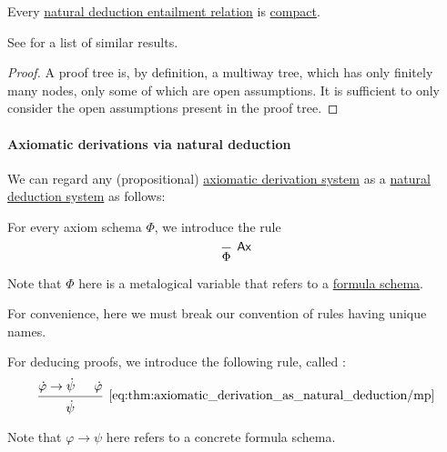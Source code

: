 \begin{proposition}\label{thm:propositional_natural_deduction_entailment_compact}
  Every \hyperref[def:natural_deduction_entailment]{natural deduction entailment relation} is \hyperref[def:consequence_relation/compactness]{compact}.
\end{proposition}
\begin{comments}
  \item See  for a list of similar results.
\end{comments}
\begin{proof}
  A proof tree is, by definition, a multiway tree, which has only finitely many nodes, only some of which are open assumptions. It is sufficient to only consider the open assumptions present in the proof tree.
\end{proof}

\paragraph{Axiomatic derivations via natural deduction}

\begin{remark}\label{rem:axiomatic_derivation_system_as_natural_deduction_system}
  We can regard any (propositional) \hyperref[def:axiomatic_derivation_system]{axiomatic derivation system} as a \hyperref[def:propositional_natural_deduction_system]{natural deduction system} as follows:
  \begin{thmenum}
     For every axiom schema \( \Phi \), we introduce the rule
    \begin{equation*}
      \begin{prooftree}
        \infer0[\logic{Ax}]{ \Phi }
      \end{prooftree}
    \end{equation*}

    Note that \( \Phi \) here is a metalogical variable that refers to a \hyperref[def:propositional_formula_schema]{formula schema}.

    For convenience, here we must break our convention of rules having unique names.

     For deducing proofs, we introduce the following rule, called :
    \begin{equation*}\taglabel[\( \logic{MP} \)]{eq:thm:axiomatic_derivation_as_natural_deduction/mp}
      \begin{prooftree}
        \hypo{ \syn\varphi \rightarrow \syn\psi }
        \hypo{ \syn\varphi }
        \infer2[\ref{eq:thm:axiomatic_derivation_as_natural_deduction/mp}]{ \syn\psi }
      \end{prooftree}
    \end{equation*}

    Note that \( \varphi \rightarrow \psi \) here refers to a concrete formula schema.
  \end{thmenum}
\end{remark}

